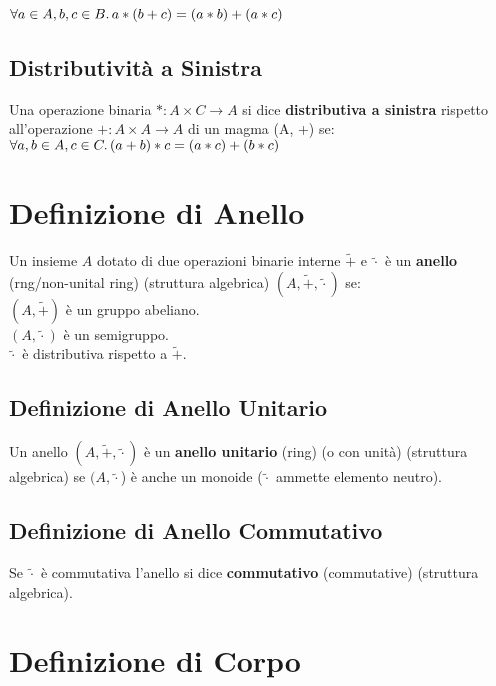 \documentclass[a4paper, twoside, italian, 11pt]{book}
\begin{document}
$\forall a \in A, b, c \in B \ldotp a * (b + c) = (a * b) + (a * c)$


\subsection{Distributività a Sinistra}

Una operazione binaria $* : A \times C \rightarrow A$ si dice \textbf{distributiva a sinistra} rispetto all'operazione $+ : A \times A \rightarrow A$ di un magma (A, +) se: \\

$\forall a, b \in A, c \in C \ldotp (a + b) * c = (a * c) + (b * c)$



\section{Definizione di Anello}

Un insieme $A$ dotato di due operazioni binarie interne $\tilde +$ e $\tilde\cdot$ è un \textbf{anello} (rng/non-unital ring) (struttura algebrica) $(A, \tilde +, \tilde\cdot)$ se: \\

$(A, \tilde +)$ è un gruppo abeliano. \\
\indent
$(A, \tilde\cdot)$ è un semigruppo. \\
\indent
$\tilde\cdot$ è distributiva rispetto a $\tilde +$.


\subsection{Definizione di Anello Unitario}

Un anello $(A, \tilde +, \tilde\cdot)$ è un \textbf{anello unitario} (ring) (o con unità) (struttura algebrica) se $(A, \tilde\cdot$) è anche un monoide ($\tilde\cdot$ ammette elemento neutro).


\subsection{Definizione di Anello Commutativo}

Se $\tilde\cdot$ è commutativa l'anello si dice \textbf{commutativo} (commutative) (struttura algebrica).



\section{Definizione di Corpo}
\end{document}
